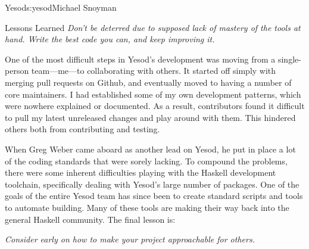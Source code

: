 \begin{aosachapter}{Yesod}{s:yesod}{Michael Snoyman}
\begin{aosasect1}{Lessons Learned}
\emph{Don't be deterred due to supposed lack of mastery of the tools
  at hand. Write the best code you can, and keep improving it.}

One of the most difficult steps in Yesod's development was moving from
a single-person team---me---to collaborating with others. It started
off simply with merging pull requests on Github, and eventually moved
to having a number of core maintainers. I had established some of my
own development patterns, which were nowhere explained or
documented. As a result, contributors found it difficult to pull my
latest unreleased changes and play around with them. This hindered
others both from contributing and testing.

When Greg Weber came aboard as another lead on Yesod, he put in place
a lot of the coding standards that were sorely lacking. To compound
the problems, there were some inherent difficulties playing with the
Haskell development toolchain, specifically dealing with Yesod's large
number of packages. One of the goals of the entire Yesod team has
since been to create standard scripts and tools to automate
building. Many of these tools are making their way back into the
general Haskell community. The final lesson is:

\emph{Consider early on how to make your project approachable for
  others.}

\end{aosasect1}
\end{aosachapter}

